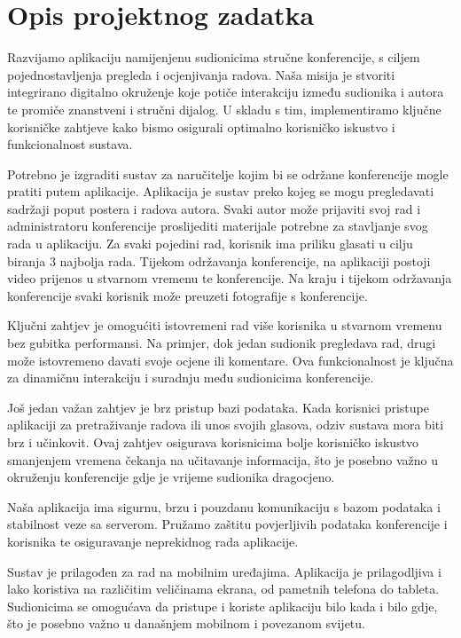 \chapter{Opis projektnog zadatka}
		
		Razvijamo aplikaciju namijenjenu sudionicima stručne konferencije, s ciljem pojednostavljenja pregleda i ocjenjivanja radova. Naša misija je stvoriti integrirano digitalno okruženje koje potiče interakciju između sudionika i autora te promiče znanstveni i stručni dijalog. U skladu s tim, implementiramo ključne korisničke zahtjeve kako bismo osigurali optimalno korisničko iskustvo i funkcionalnost sustava.
		
		Potrebno je izgraditi sustav za naručitelje kojim bi se održane konferencije mogle pratiti putem aplikacije. Aplikacija je sustav preko kojeg se mogu pregledavati sadržaji poput postera i radova autora. Svaki autor može prijaviti svoj rad i administratoru konferencije proslijediti materijale potrebne za stavljanje svog rada u aplikaciju. Za svaki pojedini rad, korisnik ima priliku glasati u cilju biranja 3 najbolja rada. Tijekom održavanja konferencije, na aplikaciji postoji video prijenos u stvarnom vremenu te konferencije. Na kraju i tijekom održavanja konferencije svaki korisnik može preuzeti fotografije s konferencije.
		
		Ključni zahtjev je omogućiti istovremeni rad više korisnika u stvarnom vremenu bez gubitka performansi. Na primjer, dok jedan sudionik pregledava rad, drugi može istovremeno davati svoje ocjene ili komentare. Ova funkcionalnost je ključna za dinamičnu interakciju i suradnju među sudionicima konferencije.
		
		Još jedan važan zahtjev je brz pristup bazi podataka. Kada korisnici pristupe aplikaciji za pretraživanje radova ili unos svojih glasova, odziv sustava mora biti brz i učinkovit. Ovaj zahtjev osigurava korisnicima bolje korisničko iskustvo smanjenjem vremena čekanja na učitavanje informacija, što je posebno važno u okruženju konferencije gdje je vrijeme sudionika dragocjeno.
		
		Naša aplikacija ima sigurnu, brzu i pouzdanu komunikaciju s bazom podataka i stabilnost veze sa serverom. Pružamo zaštitu povjerljivih podataka konferencije i korisnika te osiguravanje neprekidnog rada aplikacije.
		
		\newpage
		
		Sustav je prilagođen za rad na mobilnim uređajima. Aplikacija je prilagodljiva i lako koristiva na različitim veličinama ekrana, od pametnih telefona do tableta. Sudionicima se omogućava da pristupe i koriste aplikaciju bilo kada i bilo gdje, što je posebno važno u današnjem mobilnom i povezanom svijetu.
		
